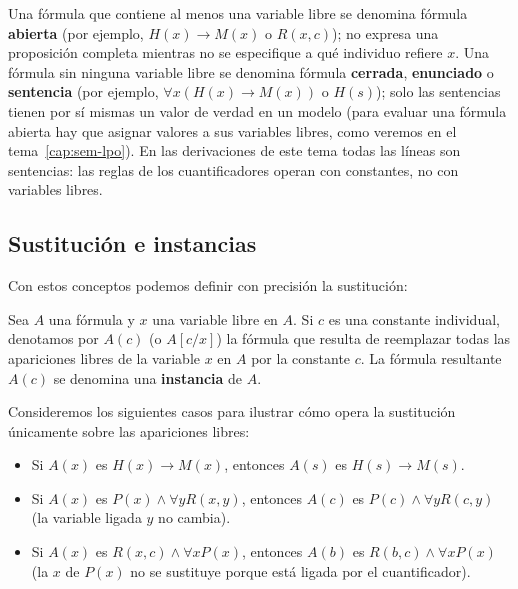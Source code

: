 Una fórmula que contiene al menos una variable libre se denomina fórmula \textbf{abierta} (por ejemplo, $H(x) \to M(x)$ o $R(x, c)$); no expresa una proposición completa mientras no se especifique a qué individuo refiere $x$. Una fórmula sin ninguna variable libre se denomina fórmula \textbf{cerrada}, \textbf{enunciado} o \textbf{sentencia} (por ejemplo, $\forall x (H(x) \to M(x))$ o $H(s)$); solo las sentencias tienen por sí mismas un valor de verdad en un modelo (para evaluar una fórmula abierta hay que asignar valores a sus variables libres, como veremos en el tema~\ref{cap:sem-lpo}). En las derivaciones de este tema todas las líneas son sentencias: las reglas de los cuantificadores operan con constantes, no con variables libres.

\subsection{Sustitución e instancias}

Con estos conceptos podemos definir con precisión la sustitución:

\begin{definition}
Sea $A$ una fórmula y $x$ una variable libre en $A$. Si $c$ es una constante individual, denotamos por $A(c)$ (o $A[c/x]$) la fórmula que resulta de reemplazar todas las apariciones libres de la variable $x$ en $A$ por la constante $c$. La fórmula resultante $A(c)$ se denomina una \textbf{instancia} de $A$.
\end{definition}

\begin{ejemplo}
Consideremos los siguientes casos para ilustrar cómo opera la sustitución únicamente sobre las apariciones libres:
\begin{itemize}
    \item Si $A(x)$ es $H(x) \to M(x)$, entonces $A(s)$ es $H(s) \to M(s)$.
    \item Si $A(x)$ es $P(x) \land \forall y R(x, y)$, entonces $A(c)$ es $P(c) \land \forall y R(c, y)$ (la variable ligada $y$ no cambia).
    \item Si $A(x)$ es $R(x,c) \land \forall x P(x)$, entonces $A(b)$
      es
      $R(b,c) \land \forall x P(x)$ (la $x$ de $P(x)$ no
      se sustituye porque está ligada por el cuantificador).
\end{itemize}
\end{ejemplo}


